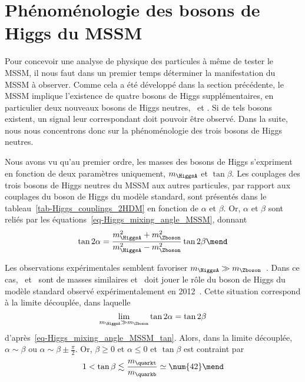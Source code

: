 \section{Phénoménologie des bosons de Higgs du MSSM}\label{chapter-MS-MSSM-section-pheno_Higgs_MSSM}
Pour concevoir une analyse de physique des particules à même de tester le MSSM, il nous faut dans un premier temps déterminer la manifestation du MSSM à observer.
Comme cela a été développé dans la section précédente, le MSSM implique l'existence de quatre bosons de Higgs supplémentaires, en particulier deux nouveaux bosons de Higgs neutres, \Higgs\ et \HiggsA.
Si de tels bosons existent, un signal leur correspondant doit pouvoir être observé.
Dans la suite, nous nous concentrons donc sur la phénoménologie des trois bosons de Higgs neutres.
\par Nous avons vu qu'au premier ordre, les masses des bosons de Higgs s'expriment en fonction de deux paramètres uniquement, $m_{\HiggsA}$ et $\tan\beta$.
Les couplages des trois bosons de Higgs neutres du MSSM aux autres particules, par rapport aux couplages du boson de Higgs du modèle standard, sont présentés dans le tableau~\ref{tab-Higgs_couplings_2HDM} en fonction de $\alpha$ et $\beta$.
Or, $\alpha$ et $\beta$ sont reliés par les équations~\eqref{eq-Higgs_mixing_angle_MSSM}, donnant
\begin{equation}
\tan 2\alpha = \frac{m_{\HiggsA}^2+m_{\Zboson}^2}{m_{\HiggsA}^2-m_{\Zboson}^2} \tan 2\beta
\mend
\label{eq-Higgs_mixing_angle_MSSM_tan}
\end{equation}
\par Les observations expérimentales semblent favoriser $m_{\HiggsA}\gg m_{\Zboson}$~\cite{ATLAS-CMS-Higgs_combined_1,ATLAS-CMS-Higgs_combined_2,CMS-MSSM-HTT_2014}.
Dans ce cas, \Higgs\ et \HiggsA\ sont de masses similaires et \higgs\ doit jouer le rôle du boson de Higgs du modèle standard observé expérimentalement en 2012~\cite{ATLAS_Higgs_discovery,CMS_Higgs_discovery,CMS_Higgs_discovery_2013}.
Cette situation correspond à la limite découplée, dans laquelle
\begin{equation}
\lim_{m_{\HiggsA}\gg m_{\Zboson}} \tan 2\alpha = \tan 2\beta
\end{equation}
d'après~\eqref{eq-Higgs_mixing_angle_MSSM_tan}.
Alors, dans la limite découplée, $\alpha \sim \beta$ ou $\alpha\sim\beta\pm\frac{\pi}{2}$.
Or, $\beta\geq0$ et $\alpha\leq0$ et $\tan\beta$ est contraint par~\cite{Ridolfi-SUSY}
\begin{equation}
1 < \tan\beta \lesssim \frac{m_{\quarkt}}{m_{\quarkb}} \simeq \num{42} \mend
\end{equation}

